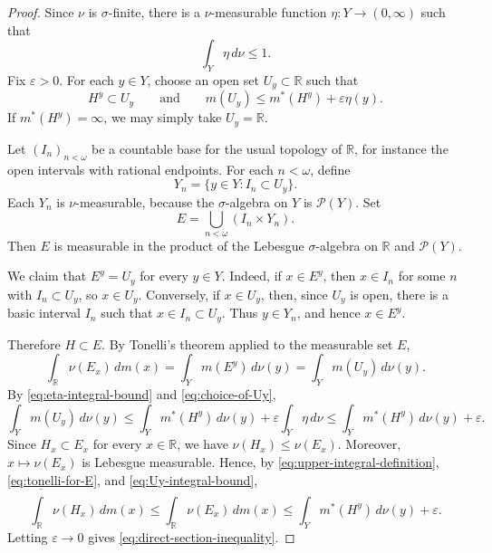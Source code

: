 \documentclass{amsart}
\theoremstyle{plain}
\theoremstyle{definition}
\newcommand{\R}{\mathbb{R}}
\newcommand{\Pc}{\mathcal{P}}
\begin{document}
\begin{proof}
Since $\nu$ is $\sigma$-finite, there is a $\nu$-measurable function $\eta:Y\to(0,\infty)$ such that
\begin{equation}\label{eq:eta-integral-bound}
\int_Y \eta\,d\nu
\le
1.
\end{equation}
Fix $\varepsilon>0$.
For each $y\in Y$, choose an open set $U_y\subset\R$ such that
\begin{equation}\label{eq:choice-of-Uy}
H^y\subset U_y
\qquad\text{and}\qquad
m(U_y)\le m^*(H^y)+\varepsilon\eta(y).
\end{equation}
If $m^*(H^y)=\infty$, we may simply take $U_y=\R$.

Let $(I_n)_{n<\omega}$ be a countable base for the usual topology of $\R$, for instance the open intervals with rational endpoints.
For each $n<\omega$, define
\[
Y_n=\{y\in Y:I_n\subset U_y\}.
\]
Each $Y_n$ is $\nu$-measurable, because the $\sigma$-algebra on $Y$ is $\Pc(Y)$.
Set
\[
E=\bigcup_{n<\omega}(I_n\times Y_n).
\]
Then $E$ is measurable in the product of the Lebesgue $\sigma$-algebra on $\R$ and $\Pc(Y)$.

We claim that $E^y=U_y$ for every $y\in Y$.
Indeed, if $x\in E^y$, then $x\in I_n$ for some $n$ with $I_n\subset U_y$, so $x\in U_y$.
Conversely, if $x\in U_y$, then, since $U_y$ is open, there is a basic interval $I_n$ such that $x\in I_n\subset U_y$.
Thus $y\in Y_n$, and hence $x\in E^y$.

Therefore $H\subset E$.
By Tonelli's theorem applied to the measurable set $E$,
\begin{equation}\label{eq:tonelli-for-E}
\int_\R \nu(E_x)\,dm(x)
=
\int_Y m(E^y)\,d\nu(y)
=
\int_Y m(U_y)\,d\nu(y).
\end{equation}
By \eqref{eq:eta-integral-bound} and \eqref{eq:choice-of-Uy},
\begin{equation}\label{eq:Uy-integral-bound}
\int_Y m(U_y)\,d\nu(y)
\le
\int_Y m^*(H^y)\,d\nu(y)+\varepsilon\int_Y \eta\,d\nu
\le
\int_Y m^*(H^y)\,d\nu(y)+\varepsilon.
\end{equation}
Since $H_x\subset E_x$ for every $x\in\R$, we have $\nu(H_x)\le\nu(E_x)$.
Moreover, $x\mapsto\nu(E_x)$ is Lebesgue measurable.
Hence, by \eqref{eq:upper-integral-definition}, \eqref{eq:tonelli-for-E}, and \eqref{eq:Uy-integral-bound},
\[
\overline{\int_\R}\nu(H_x)\,dm(x)
\le
\int_\R \nu(E_x)\,dm(x)
\le
\int_Y m^*(H^y)\,d\nu(y)+\varepsilon.
\]
Letting $\varepsilon\to0$ gives \eqref{eq:direct-section-inequality}.
\end{proof}
\end{document}
